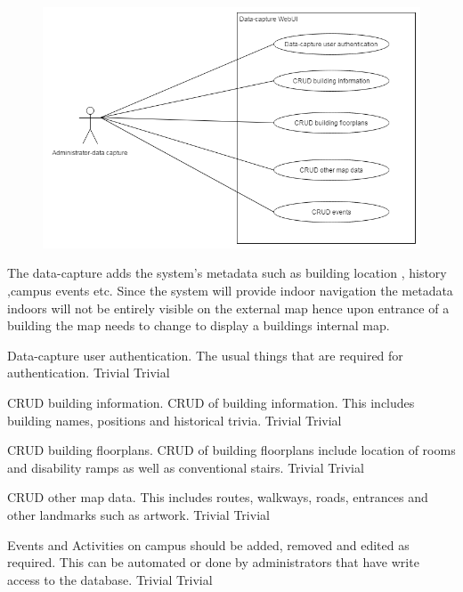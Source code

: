 \begin{figure}[h]
  \includegraphics[width=\textwidth]{diagrams/Specific_Requirements/data_capture_WebUI.png}
\end{figure}

The data-capture adds the system's metadata such as building location , history ,campus events etc. Since the system will provide indoor navigation the metadata indoors will not be entirely visible on the external map hence upon entrance of a building the map needs to change to display a buildings internal map.

\FuncReq
{Data-capture user authentication.}
{The usual things that are required for authentication.}
{Trivial}
{Trivial}

\FuncReq
{CRUD building information.}
{CRUD of building information. This includes building names, positions and historical trivia.}
{Trivial}
{Trivial}

\FuncReq
{CRUD building floorplans.}
{CRUD of building floorplans include location of rooms and disability ramps as well as conventional stairs.}
{Trivial}
{Trivial}

\FuncReq
{CRUD other map data.}
{This includes routes, walkways, roads, entrances and other landmarks such as artwork.}
{Trivial}
{Trivial}
 
{Events and Activities on campus should be added, removed and edited as required. This can be automated or done by administrators that have write access to the database.}
{Trivial}
{Trivial}
